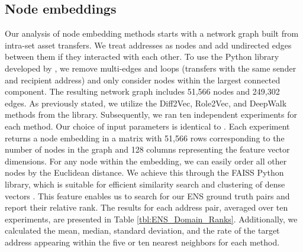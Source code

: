 \documentclass[12pt,a4paper,titlepage,oneside,english]{article}
\begin{document}
\subsection{Node embeddings}
Our analysis of node embedding methods starts with a network graph built from intra-set asset transfers. We treat addresses as nodes and add undirected edges between them if they interacted with each other. \newline
To use the Python library developed by \cite{karateclub}, we remove multi-edges and loops (transfers with the same sender and recipient address) and only consider nodes within the largest connected component. The resulting network graph includes 51,566 nodes and 249,302 edges. As previously stated, we utilize the Diff2Vec, Role2Vec, and DeepWalk methods from the library. \newline
Subsequently, we ran ten independent experiments for each method. Our choice of input parameters is identical to \cite{Beres2020}. Each experiment returns a node embedding in a matrix with 51,566 rows corresponding to the number of nodes in the graph and 128 columns representing the feature vector dimensions. \newline
For any node within the embedding, we can easily order all other nodes by the Euclidean distance. We achieve this through the FAISS Python library, which is suitable for efficient similarity search and clustering of dense vectors \citep{johnson2019faiss}.\newline 
This feature enables us to search for our ENS ground truth pairs and report their relative rank. The results for each address pair, averaged over ten experiments, are presented in Table \ref{tbl:ENS_Domain_Ranks}. Additionally, we calculated the mean, median, standard deviation, and the rate of the target address appearing within the five or ten nearest neighbors for each method.
\end{document}
